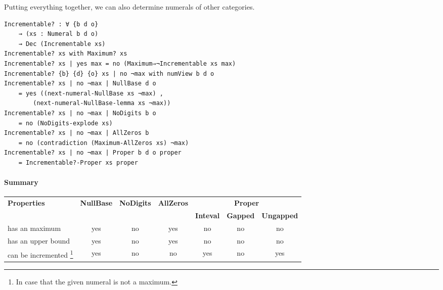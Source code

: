 \documentclass[\main/thesis.tex]{subfiles}
\begin{document}
Putting everything together, we can also determine numerals of other categories.

\begin{lstlisting}
Incrementable? : ∀ {b d o}
    → (xs : Numeral b d o)
    → Dec (Incrementable xs)
Incrementable? xs with Maximum? xs
Incrementable? xs | yes max = no (Maximum⇒¬Incrementable xs max)
Incrementable? {b} {d} {o} xs | no ¬max with numView b d o
Incrementable? xs | no ¬max | NullBase d o
    = yes ((next-numeral-NullBase xs ¬max) ,
        (next-numeral-NullBase-lemma xs ¬max))
Incrementable? xs | no ¬max | NoDigits b o
    = no (NoDigits-explode xs)
Incrementable? xs | no ¬max | AllZeros b
    = no (contradiction (Maximum-AllZeros xs) ¬max)
Incrementable? xs | no ¬max | Proper b d o proper
    = Incrementable?-Proper xs proper
\end{lstlisting}

\paragraph{Summary}

\begin{center}
    \begin{adjustbox}{max width=\textwidth}
    \begin{tabular}{|l|c|c|c|c|c|c|}
        \hline
        \multirow{2}{*}{\textbf{Properties}} &
        \multirow{2}{*}{\textbf{NullBase}} &
        \multirow{2}{*}{\textbf{NoDigits}} &
        \multirow{2}{*}{\textbf{AllZeros}} &
        \multicolumn{3}{c|}{\textbf{Proper}} \\
        \cline{5 - 7}
        & & & & \textbf{Inteval} & \textbf{Gapped} & \textbf{Ungapped} \\
        \hline
        has an maximum     & yes & no & yes & no & no & no \\
        has an upper bound & yes & no & yes & no & no & no \\
        can be incremented
        \footnote{In case that the given numeral is not a maximum.}
         & yes & no & no  & yes & no & yes \\
        \hline
    \end{tabular}

    \end{adjustbox}
\end{center}
\end{document}

